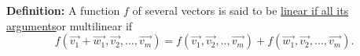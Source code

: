 \documentclass{report}
\begin{document}
\textbf{Definition:} A function $f$ of several vectors is said to be \underline{linear if all its arguments}or multilinear if 
\[
f \left( \vec{v_1} +\vec{w_1} , \vec{v_2} ,\ldots, \vec{v_m}  \right) = f \left( \vec{v_1} ,\vec{v_2} ,..,\vec{v_m}  \right) +f \left( \vec{w_1} ,\vec{v_2} ,\ldots,\vec{v_m}  \right) 
.\] 
\end{document}

